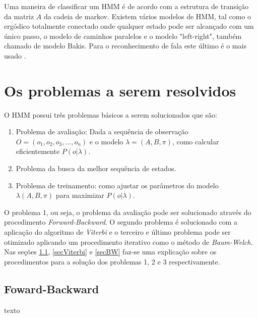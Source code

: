 \quad Uma maneira de classificar um HMM é de acordo com a estrutura de transição da matriz $A$ da cadeia de markov. Existem vários modelos de HMM, tal como o ergódico totalmente conectado onde qualquer estado pode ser alcançado com um único passo, o modelo de caminhos paralelos e o modelo "left-right", também chamado de modelo Bakis. Para o reconhecimento de fala este último é o mais usado \cite{fundRecFala}.%

\section{Os problemas a serem resolvidos}
\quad O HMM possui três problemas básicos a serem solucionados que são:
\begin{enumerate}
\item Problema de avaliação: Dada a sequência de observação $O = (o_1, o_2, o_3, ..., o_n)$ e o modelo $\lambda = (A, B, \pi)$, como calcular eficientemente $P(o| \lambda)$.
\item Problema da busca da melhor sequência de estados.
\item Problema de treinamento: como ajustar os parâmetros do modelo $\lambda(A, B, \pi)$ para maximizar $P(o|\lambda)$.
\end{enumerate}

O problema 1, ou seja, o problema da avaliação pode ser solucionado através do procedimento \textit{Forward-Backward}. O segundo problema é solucionado com a aplicação do algoritmo de \textit{Viterbi} e o terceiro e último problema pode ser otimizado aplicando um procedimento iterativo como o método de \textit{Baum-Welch}. Nas seções \ref{secFB}, \ref{secViterbi} e \ref{secBW} faz-se uma explicação sobre os procedimentos para a solução dos problemas 1, 2 e 3 respectivamente.

\subsection{Foward-Backward}
\label{secFB}
 texto

